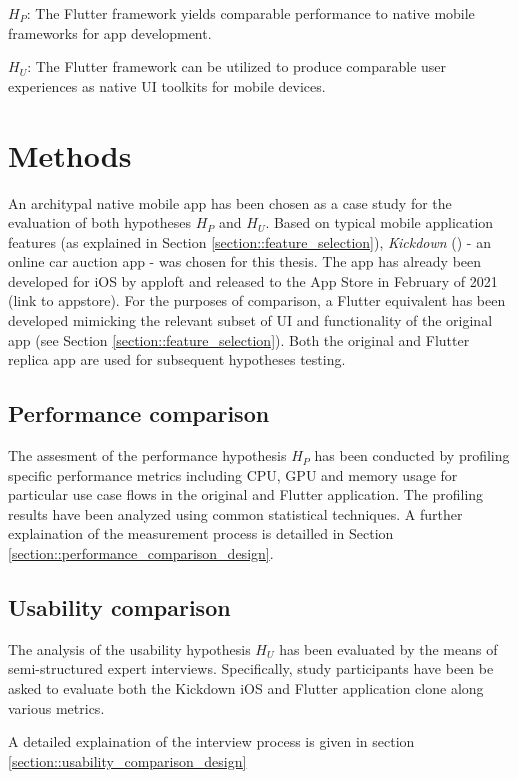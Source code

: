 \textbf{$H_P$}: The Flutter framework yields comparable performance to native mobile frameworks for app development.

\textbf{$H_U$}: The Flutter framework can be utilized to produce comparable user experiences as native UI toolkits for mobile devices.

\section{Methods}
An architypal native mobile app has been chosen as a case study for the evaluation of both hypotheses $H_P$ and $H_U$.
Based on typical mobile application features (as explained in Section \ref{section::feature_selection}), \textit{Kickdown} (\cite{Kickdown2021}) - an online car auction app - was chosen for this thesis. 
The app has already been developed for iOS by apploft and released to the App Store in February of 2021 (link to appstore).
For the purposes of comparison, a Flutter equivalent has been developed mimicking the relevant subset of UI and functionality of the original app (see Section \ref{section::feature_selection}). 
Both the original and Flutter replica app are used for subsequent hypotheses testing.


\subsection{Performance comparison}
The assesment of the performance hypothesis $H_P$ has been conducted by profiling specific performance metrics including CPU, GPU and memory usage 
for particular use case flows in the original and Flutter application. 
The profiling results have been analyzed using common statistical techniques.
A further explaination of the measurement process is detailled in Section \ref{section::performance_comparison_design}.

\subsection{Usability comparison}
The analysis of the usability hypothesis $H_U$ has been evaluated by the means of semi-structured expert interviews.
Specifically, study participants have been be asked to evaluate both the Kickdown iOS and Flutter application clone along various metrics.

A detailed explaination of the interview process is given in section \ref{section::usability_comparison_design}

